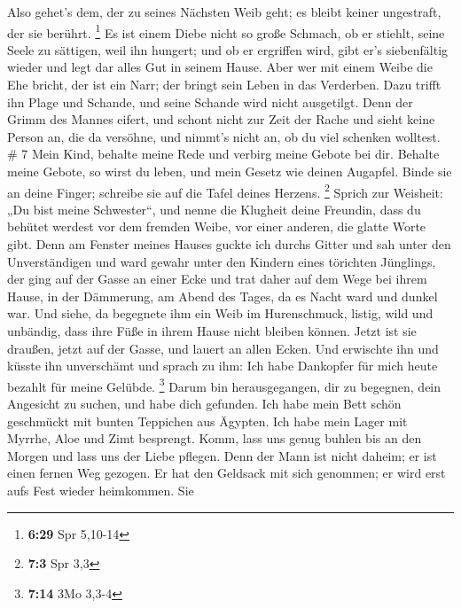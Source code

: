  Also gehet's dem, der zu seines Nächsten Weib geht; es
bleibt keiner ungestraft, der sie berührt. \footnote{\textbf{6:29} Spr
  5,10-14}  Es ist einem Diebe nicht so große Schmach, ob
er stiehlt, seine Seele zu sättigen, weil ihn hungert;  und
ob er ergriffen wird, gibt er's siebenfältig wieder und legt dar alles
Gut in seinem Hause.  Aber wer mit einem Weibe die Ehe
bricht, der ist ein Narr; der bringt sein Leben in das Verderben.
 Dazu trifft ihn Plage und Schande, und seine Schande wird
nicht ausgetilgt.  Denn der Grimm des Mannes eifert, und
schont nicht zur Zeit der Rache  und sieht keine Person an,
die da versöhne, und nimmt's nicht an, ob du viel schenken wolltest. \#
7  Mein Kind, behalte meine Rede und verbirg meine Gebote
bei dir.  Behalte meine Gebote, so wirst du leben, und mein
Gesetz wie deinen Augapfel.  Binde sie an deine Finger;
schreibe sie auf die Tafel deines Herzens. \footnote{\textbf{7:3} Spr
  3,3}  Sprich zur Weisheit: „Du bist meine Schwester``, und
nenne die Klugheit deine Freundin,  dass du behütet werdest
vor dem fremden Weibe, vor einer anderen, die glatte Worte gibt.
 Denn am Fenster meines Hauses guckte ich durchs Gitter
 und sah unter den Unverständigen und ward gewahr unter den
Kindern eines törichten Jünglings,  der ging auf der Gasse
an einer Ecke und trat daher auf dem Wege bei ihrem Hause, 
in der Dämmerung, am Abend des Tages, da es Nacht ward und dunkel war.
 Und siehe, da begegnete ihm ein Weib im Hurenschmuck,
listig,  wild und unbändig, dass ihre Füße in ihrem Hause
nicht bleiben können.  Jetzt ist sie draußen, jetzt auf der
Gasse, und lauert an allen Ecken.  Und erwischte ihn und
küsste ihn unverschämt und sprach zu ihm:  Ich habe
Dankopfer für mich heute bezahlt für meine Gelübde. \footnote{\textbf{7:14}
  3Mo 3,3-4}  Darum bin herausgegangen, dir zu begegnen,
dein Angesicht zu suchen, und habe dich gefunden.  Ich habe
mein Bett schön geschmückt mit bunten Teppichen aus Ägypten.
 Ich habe mein Lager mit Myrrhe, Aloe und Zimt besprengt.
 Komm, lass uns genug buhlen bis an den Morgen und lass uns
der Liebe pflegen.  Denn der Mann ist nicht daheim; er ist
einen fernen Weg gezogen.  Er hat den Geldsack mit sich
genommen; er wird erst aufs Fest wieder heimkommen.  Sie
